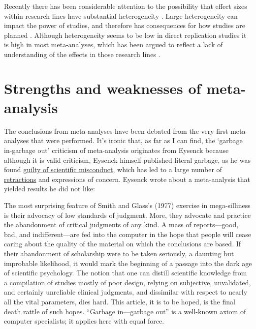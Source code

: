 \documentclass[
  oneside]{krantz}
\renewenvironment{quote}{\begin{VF}}{\end{VF}}
\begin{document}
Recently there has been considerable attention to the possibility that effect sizes within research lines have substantial heterogeneity \citep{bryan_behavioural_2021}. Large heterogeneity can impact the power of studies, and therefore has consequences for how studies are planned \citep{kenny_unappreciated_2019}. Although heterogeneity seems to be low in direct replication studies \citep{olsson-collentine_heterogeneity_2020} it is high in most meta-analyses, which has been argued to reflect a lack of understanding of the effects in those research lines \citep{linden_heterogeneity_2021}.

\hypertarget{strengths-and-weaknesses-of-meta-analysis}{%
\section{Strengths and weaknesses of meta-analysis}\label{strengths-and-weaknesses-of-meta-analysis}}

The conclusions from meta-analyses have been debated from the very first meta-analyses that were performed. It's ironic that, as far as I can find, the `garbage in-garbage out' criticism of meta-analysis originates from Eysenck \citeyearpar{eysenck_exercise_1978} because although it is valid criticism, Eysenck himself published literal garbage, as he was found \href{https://www.science.org/content/article/misconduct-allegations-push-psychology-hero-his-pedestal}{guilty of scientific misconduct}, which has led to a large number of \href{http://retractiondatabase.org/RetractionSearch.aspx?AspxAutoDetectCookieSupport=1\#?AspxAutoDetectCookieSupport\%3d1\%26auth\%3dEysenck\%252c\%2bHans\%2bJ}{retractions} and expressions of concern. Eysenck wrote about a meta-analysis that yielded results he did not like:

\begin{quote}
The most surprising feature of Smith and Glass's (1977) exercise in mega-silliness is their advocacy of low standards of judgment. More, they advocate and practice the abandonment of critical judgments of any kind. A mass of reports---good, bad, and indifferent---are fed into the
computer in the hope that people will cease caring about the quality of the material on which the conclusions are based. If their abandonment of scholarship were to be taken seriously, a daunting but improbable likelihood, it would mark the beginning of a passage into the dark age of scientific psychology.
The notion that one can distill scientific knowledge from a compilation of studies mostly of poor design, relying on subjective, unvalidated, and certainly unreliable clinical judgments, and dissimilar with respect to nearly all the vital parameters, dies hard. This article, it is to be hoped, is the final death rattle of such hopes. ``Garbage in---garbage out'' is a well-known axiom of computer specialists; it applies here with equal force.
\end{quote}
\end{document}
